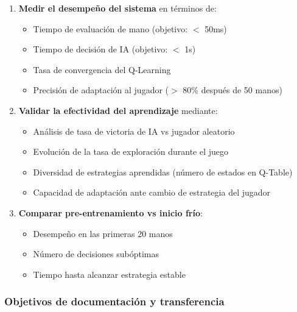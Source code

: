 \documentclass[12pt,a4paper]{article}
\begin{document}
\begin{enumerate}
    \item \textbf{Medir el desempeño del sistema} en términos de:
    \begin{itemize}
        \item Tiempo de evaluación de mano (objetivo: $<$ 50ms)
        \item Tiempo de decisión de IA (objetivo: $<$ 1s)
        \item Tasa de convergencia del Q-Learning
        \item Precisión de adaptación al jugador ($>$ 80\% después de 50 manos)
    \end{itemize}
    
    \item \textbf{Validar la efectividad del aprendizaje} mediante:
    \begin{itemize}
        \item Análisis de tasa de victoria de IA vs jugador aleatorio
        \item Evolución de la tasa de exploración durante el juego
        \item Diversidad de estrategias aprendidas (número de estados en Q-Table)
        \item Capacidad de adaptación ante cambio de estrategia del jugador
    \end{itemize}
    
    \item \textbf{Comparar pre-entrenamiento vs inicio frío}:
    \begin{itemize}
        \item Desempeño en las primeras 20 manos
        \item Número de decisiones subóptimas
        \item Tiempo hasta alcanzar estrategia estable
    \end{itemize}
\end{enumerate}

\subsubsection{Objetivos de documentación y transferencia}
\end{document}
